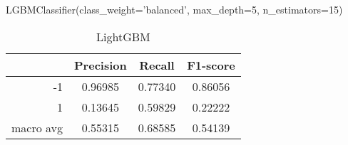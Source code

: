 LGBMClassifier(class_weight='balanced', max_depth=5, n_estimators=15)
\begin{table}[!h]
    \centering
    \renewcommand{\arraystretch}{1.5}
    \begin{tabular}{|r|c|c|c|}
        \hline
                  & Precision & Recall & F1-score \\ \hline
        -1        &     0.96985     &     0.77340   &    0.86056      \\ \hline
        1         &     0.13645      &     0.59829   &   0.22222       \\ \hline
        macro avg &      0.55315     &     0.68585   &    0.54139      \\ \hline
    \end{tabular}
    \caption{LightGBM}
\end{table}
